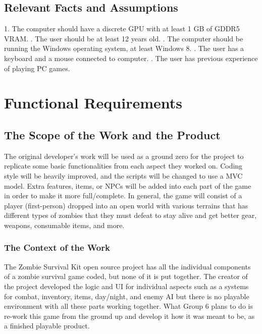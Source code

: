 \documentclass[12pt, titlepage]{article}
\begin{document}
\subsection{Relevant Facts and Assumptions}

1. The computer should have a discrete GPU with at least 1 GB of GDDR5 VRAM.
. The user should be at least 12 years old.
. The computer should be running the Windows operating system, at least Windows 8.
. The user has a keyboard and a mouse connected to computer.
. The user has previous experience of playing PC games.


\section{Functional Requirements}

\subsection{The Scope of the Work and the Product}
The original developer’s work will be used as a ground zero for the project to replicate some basic functionalities from each aspect they worked on. Coding style will be heavily improved, and the scripts will be changed to use a MVC model. Extra features, items, or NPCs will be added into each part of the game in order to make it more full/complete. In general, the game will consist of a player (first-person) dropped into an open world with various terrains that has different types of zombies that they must defeat to stay alive and get better gear, weapons, consumable items, and more.
\subsubsection{The Context of the Work}
The Zombie Survival Kit open source project has all the individual components of a zombie survival game coded, but none of it is put together. The creator of the project developed the logic and UI for individual aspects such as a systems for combat, inventory, items, day/night, and enemy AI but there is no playable environment with all these parts working together. What Group 6 plans to do is re-work this game from the ground up and develop it how it was meant to be, as a finished playable product. 
\end{document}
